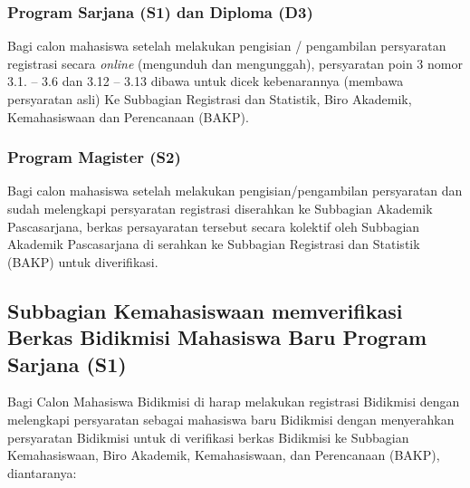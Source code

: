 \documentclass[
]{book}
\begin{document}
\hypertarget{program-sarjana-s1-dan-diploma-d3}{%
\subsubsection{Program Sarjana (S1) dan Diploma (D3)}\label{program-sarjana-s1-dan-diploma-d3}}

Bagi calon mahasiswa setelah melakukan pengisian / pengambilan persyaratan registrasi secara \emph{online} (mengunduh dan mengunggah), persyaratan poin 3 nomor 3.1. -- 3.6 dan 3.12 -- 3.13 dibawa untuk dicek kebenarannya (membawa persyaratan asli) Ke Subbagian Registrasi dan Statistik, Biro Akademik, Kemahasiswaan dan Perencanaan (BAKP).

\hypertarget{program-magister-s2}{%
\subsubsection{Program Magister (S2)}\label{program-magister-s2}}

Bagi calon mahasiswa setelah melakukan pengisian/pengambilan persyaratan dan sudah melengkapi persyaratan registrasi diserahkan ke Subbagian Akademik Pascasarjana, berkas persayaratan tersebut secara kolektif oleh Subbagian Akademik Pascasarjana di serahkan ke Subbagian Registrasi dan Statistik (BAKP) untuk diverifikasi.

\hypertarget{subbagian-kemahasiswaan-memverifikasi-berkas-bidikmisi-mahasiswa-baru-program-sarjana-s1}{%
\subsection{Subbagian Kemahasiswaan memverifikasi Berkas Bidikmisi Mahasiswa Baru Program Sarjana (S1)}\label{subbagian-kemahasiswaan-memverifikasi-berkas-bidikmisi-mahasiswa-baru-program-sarjana-s1}}

Bagi Calon Mahasiswa Bidikmisi di harap melakukan registrasi Bidikmisi dengan melengkapi persyaratan sebagai mahasiswa baru Bidikmisi dengan menyerahkan persyaratan Bidikmisi untuk di verifikasi berkas Bidikmisi ke Subbagian Kemahasiswaan, Biro Akademik, Kemahasiswaan, dan Perencanaan (BAKP), diantaranya:
\end{document}
